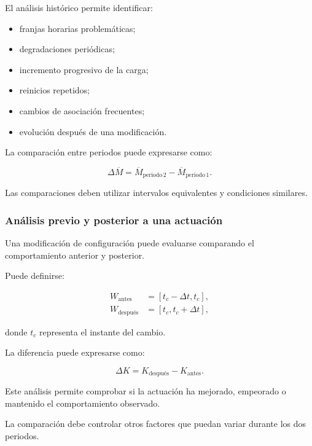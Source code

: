 El análisis histórico permite identificar:

\begin{itemize}
    \item franjas horarias problemáticas;

    \item degradaciones periódicas;

    \item incremento progresivo de la carga;

    \item reinicios repetidos;

    \item cambios de asociación frecuentes;

    \item evolución después de una modificación.
\end{itemize}

La comparación entre periodos puede expresarse como:

\[
    \Delta \overline{M}
    =
    \overline{M}_{\mathrm{periodo\,2}}
    -
    \overline{M}_{\mathrm{periodo\,1}}.
\]

Las comparaciones deben utilizar intervalos equivalentes y condiciones
similares.


\subsubsection*{Análisis previo y posterior a una actuación}

Una modificación de configuración puede evaluarse comparando el
comportamiento anterior y posterior.

Puede definirse:

\[
\begin{aligned}
    W_{\mathrm{antes}}
    &=
    [
        t_c-\Delta t,
        t_c
    ],\\
    W_{\mathrm{después}}
    &=
    [
        t_c,
        t_c+\Delta t
    ],
\end{aligned}
\]

donde \(t_c\) representa el instante del cambio.

La diferencia puede expresarse como:

\[
    \Delta K
    =
    K_{\mathrm{después}}
    -
    K_{\mathrm{antes}}.
\]

Este análisis permite comprobar si la actuación ha mejorado, empeorado o
mantenido el comportamiento observado.

La comparación debe controlar otros factores que puedan variar durante
los dos periodos.


